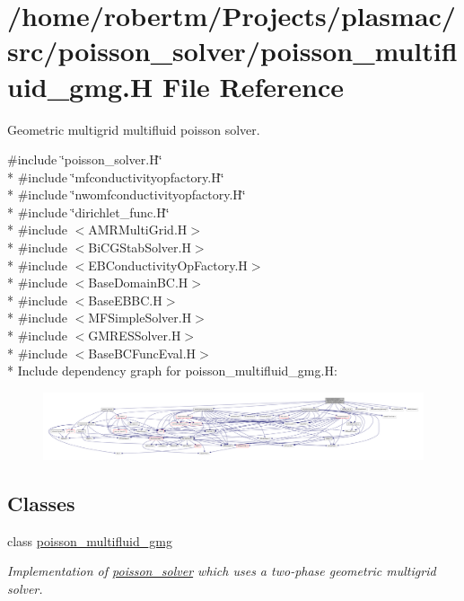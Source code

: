 \hypertarget{poisson__multifluid__gmg_8H}{}\section{/home/robertm/\+Projects/plasmac/src/poisson\+\_\+solver/poisson\+\_\+multifluid\+\_\+gmg.H File Reference}
\label{poisson__multifluid__gmg_8H}


Geometric multigrid multifluid poisson solver.  


{\ttfamily \#include \char`\"{}poisson\+\_\+solver.\+H\char`\"{}}\\*
{\ttfamily \#include \char`\"{}mfconductivityopfactory.\+H\char`\"{}}\\*
{\ttfamily \#include \char`\"{}nwomfconductivityopfactory.\+H\char`\"{}}\\*
{\ttfamily \#include \char`\"{}dirichlet\+\_\+func.\+H\char`\"{}}\\*
{\ttfamily \#include $<$A\+M\+R\+Multi\+Grid.\+H$>$}\\*
{\ttfamily \#include $<$Bi\+C\+G\+Stab\+Solver.\+H$>$}\\*
{\ttfamily \#include $<$E\+B\+Conductivity\+Op\+Factory.\+H$>$}\\*
{\ttfamily \#include $<$Base\+Domain\+B\+C.\+H$>$}\\*
{\ttfamily \#include $<$Base\+E\+B\+B\+C.\+H$>$}\\*
{\ttfamily \#include $<$M\+F\+Simple\+Solver.\+H$>$}\\*
{\ttfamily \#include $<$G\+M\+R\+E\+S\+Solver.\+H$>$}\\*
{\ttfamily \#include $<$Base\+B\+C\+Func\+Eval.\+H$>$}\\*
Include dependency graph for poisson\+\_\+multifluid\+\_\+gmg.\+H\+:\nopagebreak
\begin{figure}[H]
\begin{center}
\leavevmode
\includegraphics[width=350pt]{poisson__multifluid__gmg_8H__incl}
\end{center}
\end{figure}
\subsection*{Classes}
\begin{DoxyCompactItemize}
\item 
class \hyperlink{classpoisson__multifluid__gmg}{poisson\+\_\+multifluid\+\_\+gmg}
\begin{DoxyCompactList}\small\item\em Implementation of \hyperlink{classpoisson__solver}{poisson\+\_\+solver} which uses a two-\/phase geometric multigrid solver. \end{DoxyCompactList}\end{DoxyCompactItemize}


